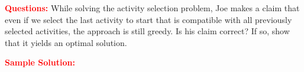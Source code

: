 \problem

\textcolor{Red}{\textbf{Questions:}}
While solving the activity selection problem, Joe makes a claim that even if we select the last activity to start that is compatible with all previously selected activities, the approach is still greedy.  Is his claim correct? If so, show that it yields an optimal solution.

\textcolor{Red}{\textbf{Sample Solution:}}
